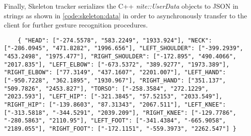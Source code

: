 Finally, Skeleton tracker serializes the C++ \textit{nite::UserData} objects to JSON in strings as shown in \ref{code:skeleton:data} in order to asynchronously transfer to the client for further gesture recognition procedures.
\begin{lstlisting}
	{ "HEAD": ["-274.5578", "583.2249", "1933.924"], "NECK": ["-286.0945", "471.8282", "1996.656"], "LEFT_SHOULDER": ["-399.2939", "453.2498", "1975.477"], "RIGHT_SHOULDER": ["-172.895", "490.4066", "2017.835"], "LEFT_ELBOW": ["-673.5372", "389.9277", "1973.389"], "RIGHT_ELBOW": ["77.3149", "437.1607", "2201.007"], "LEFT_HAND": ["-950.7228", "362.1895", "1930.967"], "RIGHT_HAND": ["351.137", "509.7826", "2453.827"], "TORSO": ["-258.3584", "272.1229", "2023.593"], "LEFT_HIP": ["-321.3845", "57.52153", "2033.549"], "RIGHT_HIP": ["-139.8603", "87.31343", "2067.511"], "LEFT_KNEE": ["-313.5818", "-344.5291", "2039.209"], "RIGHT_KNEE": ["-129.7786", "-280.5863", "2110.95"], "LEFT_FOOT": ["-341.4384", "-665.9058", "2189.055"], "RIGHT_FOOT": ["-172.1151", "-559.3973", "2262.547"] } 
\end{lstlisting}
\label{code:skeleton:data}
